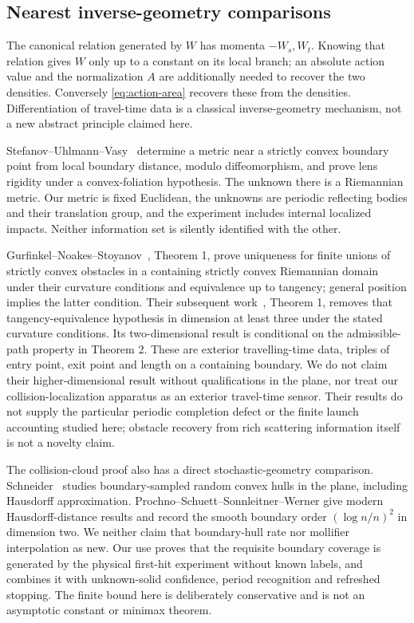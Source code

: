 \subsection{Nearest inverse-geometry comparisons}
The canonical relation generated by $W$ has momenta $-W_s,W_t$.
Knowing that relation gives $W$ only up to a constant on its local branch;
an absolute action value and the normalization $A$ are additionally
needed to recover the two densities. Conversely \eqref{eq:action-area}
recovers these from the densities. Differentiation of travel-time data
is a classical inverse-geometry mechanism, not a new abstract principle
claimed here.

Stefanov--Uhlmann--Vasy~\cite{SUV} determine a metric near a strictly
convex boundary point from local boundary distance, modulo diffeomorphism,
and prove lens rigidity under a convex-foliation hypothesis. The unknown
there is a Riemannian metric. Our metric is fixed Euclidean, the unknowns
are periodic reflecting bodies and their translation group, and the
experiment includes internal localized impacts. Neither information set
is silently identified with the other.

Gurfinkel--Noakes--Stoyanov~\cite{GNS23a}, Theorem 1, prove uniqueness
for finite unions of strictly convex obstacles in a containing strictly
convex Riemannian domain under their curvature conditions and equivalence
up to tangency; general position implies the latter condition. Their
subsequent work~\cite{GNS23b}, Theorem 1, removes that tangency-equivalence
hypothesis in dimension at least three under the stated curvature
conditions. Its two-dimensional result is conditional on the admissible-path
property in Theorem 2. These are exterior travelling-time data, triples
of entry point, exit point and length on a containing boundary. We do not
claim their higher-dimensional result without qualifications in the plane,
nor treat our collision-localization apparatus as an exterior travel-time
sensor. Their results do not supply the particular periodic completion
defect or the finite launch accounting studied here; obstacle recovery
from rich scattering information itself is not a novelty claim.

The collision-cloud proof also has a direct stochastic-geometry comparison.
Schneider~\cite{Schneider} studies boundary-sampled random convex hulls in
the plane, including Hausdorff approximation. Prochno--Schuett--Sonnleitner--Werner
\cite{PSSW} give modern Hausdorff-distance results and record the smooth
boundary order $(\log n/n)^2$ in dimension two. We neither claim that
boundary-hull rate nor mollifier interpolation as new. Our use proves
that the requisite boundary coverage is generated by the physical
first-hit experiment without known labels, and combines it with
unknown-solid confidence, period recognition and refreshed stopping.
The finite bound here is deliberately conservative and is not an
asymptotic constant or minimax theorem.

